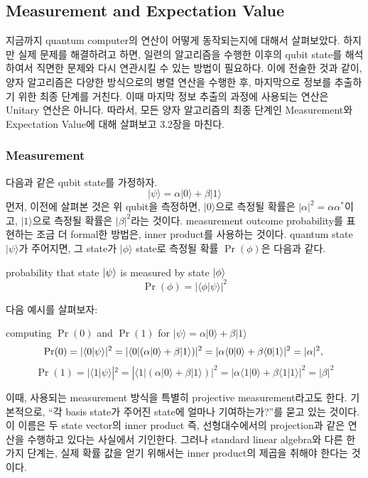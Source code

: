 \subsection{Measurement and Expectation Value}
지금까지 quantum computer의 연산이 어떻게 동작되는지에 대해서 살펴보았다. 하지만 실제 문제를 해결하려고 하면, 일련의 알고리즘을 수행한 이후의 qubit state를 해석하여서 직면한 문제와 다시 연관시킬 수 있는 방법이 필요하다. 이에 전술한 것과 같이, 양자 알고리즘은 다양한 방식으로의 병렬 연산을 수행한 후, 마지막으로 정보를 추출하기 위한 최종 단계를 거친다. 이때 마지막 정보 추출의 과정에 사용되는 연산은 Unitary 연산은 아니다. 따라서, 모든 양자 알고리즘의 최종 단계인 Measurement와 Expectation Value에 대해 살펴보고 3.2장을 마친다.

\subsubsection{Measurement}
다음과 같은 qubit state를 가정하자.
$$
|\psi \rangle = \alpha |0\rangle + \beta |1\rangle
$$
먼저, 이전에 살펴본 것은 위 qubit을 측정하면, $|0\rangle$으로 측정될 확률은 $|\alpha | ^2 = \alpha\alpha^*$이고, $|1\rangle$으로 측정될 확률은 $|\beta|^2$라는 것이다. measurement outcome probability를 표현하는 조금 더 formal한 방법은, inner product를 사용하는 것이다. quantum state $|\psi\rangle$가 주어지면, 그 state가 $|\phi \rangle$ state로 측정될 확률 \(\Pr(\phi)\)은 다음과 같다.%
\begin{definition}
    probability that state \(\ket\psi\) is measured by state \(\ket\phi\)
$$
\Pr(\phi) = |\langle \phi |\psi \rangle | ^2
$$
\end{definition}
다음 예시를 살펴보자:
\begin{example}
    computing $\Pr(0)$ and $\Pr(1)$ for $|\psi\rangle = \alpha|0\rangle + \beta|1\rangle$
\[
\Pr(0) = |\langle0|\psi\rangle|^2 =|\langle0|(\alpha|0\rangle +\beta|1\rangle)|^2 = |\alpha \langle0|0\rangle + \beta \langle0|1\rangle|^2 = |\alpha|^2, \\
\]
\[
\Pr(1) = |\langle1|\psi\rangle|^2 =|\langle1|(\alpha|0\rangle +\beta|1\rangle)|^2 = |\alpha \langle1|0\rangle + \beta \langle1|1\rangle|^2 = |\beta|^2
\]
\end{example}
이때, 사용되는 measurement 방식을 특별히 projective measurement라고도 한다. 기본적으로, “각 basis state가 주어진 state에 얼마나 기여하는가?”를 묻고 있는 것이다. 이 이름은 두 state vector의 inner product 즉, 선형대수에서의 projection과 같은 연산을 수행하고 있다는 사실에서 기인한다. 그러나 standard linear algebra와 다른 한 가지 단계는, 실제 확률 값을 얻기 위해서는 inner product의 제곱을 취해야 한다는 것이다.

